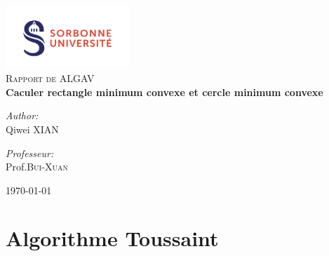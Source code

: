 \documentclass[14px]{article}
\begin{document}
\setlength{\parindent}{0pt}
\begin{titlepage}
	
	\begin{center}
		\includegraphics[width=0.35\textwidth]{logo.png}\\[1cm]    
		
		\textsc{\Large Rapport de ALGAV}\\[0.5cm]
		
		
		{ \huge \bfseries Caculer rectangle minimum convexe et cercle minimum convexe}\\[0.4cm]
		
		\begin{minipage}{0.4\textwidth}
			\begin{flushleft} \large
				\emph{Author:}\\
				Qiwei \textsc{XIAN}
			\end{flushleft}
		\end{minipage}
		\begin{minipage}{0.4\textwidth}
			\begin{flushright} \large
				\emph{Professeur:} \\
				Prof.\textsc{Bui-Xuan}
			\end{flushright}
		\end{minipage}
		
		\vfill
		{\large \today}
	\end{center}
	
\end{titlepage}
\clearpage

\tableofcontents
\thispagestyle{empty}
\clearpage

\pagestyle{fancy}	
\rhead{\thepage}
\fancyfoot{}

\section{Algorithme Toussaint}
\end{document}
